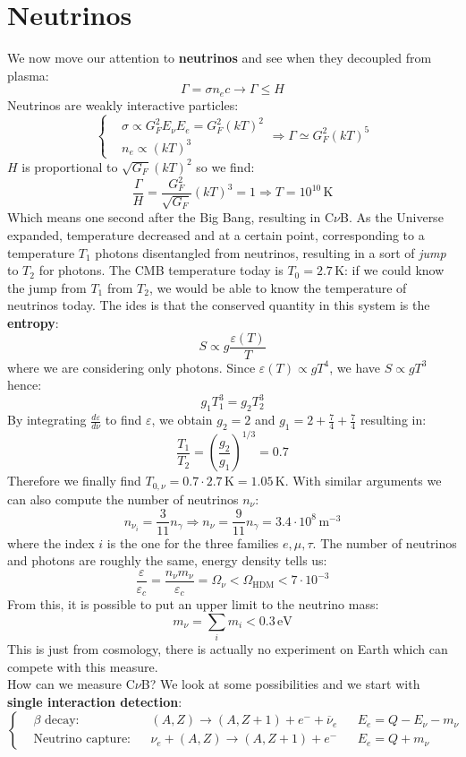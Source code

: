 \documentclass[10.75pt,a4paper,openright,bottom=2cm]{article}
\begin{document}
\section{Neutrinos}
We now move our attention to \textbf{neutrinos} and see when they decoupled from plasma:
\[
\Gamma=\sigma n_ec\to\Gamma\le H
\]
Neutrinos are weakly interactive particles:
\[
\left\{
\begin{aligned}
&\sigma\propto G_F^2E_\nu E_e=G_F^2(kT)^2\\
&n_e\propto(kT)^3
\end{aligned}
\right.
\Rightarrow\Gamma\simeq G_F^2(kT)^5
\]
$H$ is proportional to $\sqrt{G_F}(kT)^2$ so we find:
\[
\frac{\Gamma}{H}=\frac{G_F^2}{\sqrt{G_F}}(kT)^3=1\Rightarrow T=10^{10}\,\text{K}
\]
Which means one second after the Big Bang, resulting in C$\nu$B. As the Universe expanded, temperature decreased and at a certain point, corresponding to a temperature $T_1$ photons disentangled from neutrinos, resulting in a sort of \textit{jump} to $T_2$ for photons. The CMB temperature today is $T_0=2.7$\,K: if we could know the jump from $T_1$ from $T_2$, we would be able to know the temperature of neutrinos today. The ides is that the conserved quantity in this system is the \textbf{entropy}:
\[
S\propto g\frac{\varepsilon(T)}{T}
\]
where we are considering only photons. Since $\varepsilon(T)\propto gT^4$, we have $S\propto gT^3$ hence:
\[
g_1T_1^3=g_2T_2^3
\]
By integrating $\frac{d\varepsilon}{d\nu}$ to find $\varepsilon$, we obtain $g_2=2$ and $g_1=2+\frac{7}{4}+\frac{7}{4}$ resulting in:
\[
\frac{T_1}{T_2}=\left(\frac{g_2}{g_1}\right)^{1/3}=0.7
\]
Therefore we finally find $T_{0,\nu}=0.7\cdot2.7$\,K$=1.05$\,K. With similar arguments we can also compute the number of neutrinos $n_\nu$:
\[
n_{\nu_i}=\frac{3}{11}n_\gamma\Rightarrow n_\nu=\frac{9}{11}n_\gamma=3.4\cdot10^8\,\text{m$^{-3}$}
\]
where the index $i$ is the one for the three families $e,\mu,\tau$. The number of neutrinos and photons are roughly the same, energy density tells us:
\[
\frac{\varepsilon}{\varepsilon_c}=\frac{n_\nu m_\nu}{\varepsilon_c}=\Omega_\nu<\Omega_{\text{HDM}}<7\cdot10^{-3}
\]
From this, it is possible to put an upper limit to the neutrino mass:
\[
m_\nu=\sum_im_i<0.3\,\text{eV}
\]
This is just from cosmology, there is actually no experiment on Earth which can compete with this measure.\\
How can we measure C$\nu$B? We look at some possibilities and we start with \textbf{single interaction detection}:
\[
\left\{
\begin{aligned}
&\text{$\beta$ decay}: &&(A,Z)\to(A,Z+1)+e^-+\overline{\nu}_e &&E_e=Q-E_\nu-m_\nu\\
&\text{Neutrino capture}: &&\nu_e+(A,Z)\to(A,Z+1)+e^- &&E_e=Q+m_\nu
\end{aligned}
\right.
\]
\end{document}
